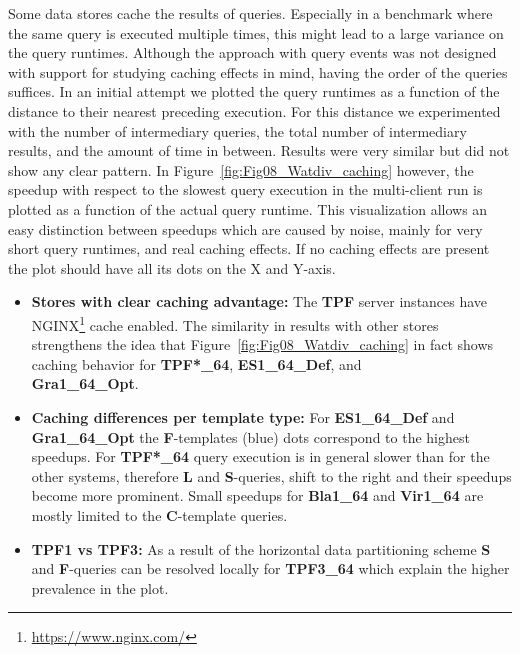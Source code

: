 %



Some data stores cache the results of queries. Especially in a benchmark where the same query is executed multiple times, this might lead to a large variance on the query runtimes. Although the approach with query events was not designed with support for studying caching effects in mind, having the order of the queries suffices. 
In an initial attempt we plotted the query runtimes as a function of the distance to their nearest preceding execution. For this distance we experimented with the number of intermediary queries, the total number of intermediary results, and the amount of time in between. Results were very similar but did not show any clear pattern. 
In Figure~\ref{fig:Fig08_Watdiv_caching} however, the speedup with respect to the slowest query execution in the multi-client run is plotted as a function of the actual query runtime. This visualization allows an easy distinction between speedups which are caused by noise, mainly for very short query runtimes, and real caching effects. If no caching effects are present the plot should have all its dots on the X and Y-axis.
\begin{itemize}
	\item \textbf{Stores with clear caching advantage:} The \textbf{TPF} server instances have NGINX\footnote{\scriptsize \url{https://www.nginx.com/}} cache enabled. The similarity in results with other stores strengthens the idea that Figure~\ref{fig:Fig08_Watdiv_caching} in fact shows caching behavior for 
	\textbf{TPF*\_64}, \textbf{ES1\_64\_Def}, and \\ \textbf{Gra1\_64\_Opt}.
	
	\item \textbf{Caching differences per template type:} For \textbf{ES1\_64\_Def} and \textbf{Gra1\_64\_Opt} the \textbf{F}-templates (blue) dots correspond to the highest speedups. For \textbf{TPF*\_64} query execution is in general slower than for the other systems, therefore \textbf{L} and \textbf{S}-queries, shift to the right and their speedups become more prominent. Small speedups for \textbf{Bla1\_64} and \textbf{Vir1\_64} are mostly limited to the \textbf{C}-template queries.
	\item \textbf{TPF1 vs TPF3:} As a result of the horizontal data partitioning scheme \textbf{S} and \textbf{F}-queries can be resolved locally for \textbf{TPF3\_64} which explain the higher prevalence in the plot.
\end{itemize}






